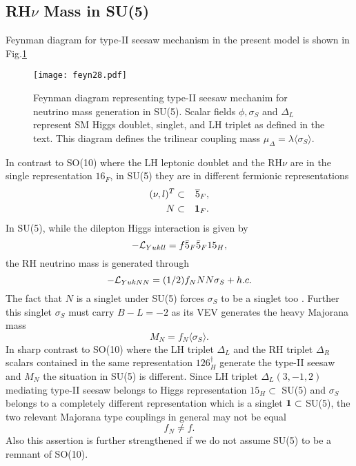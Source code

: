 \documentclass[a4paper,11pt]{article}
\newcommand{\be}{\begin{equation}}
\newcommand{\ee}{\end{equation}}
\newcommand{\bea}{\begin{eqnarray}}
\newcommand{\eea}{\end{eqnarray}}
\begin{document}
\subsection{RH$\nu$ Mass in SU(5)}

Feynman diagram for type-II seesaw mechanism in the present model is
shown in Fig.\ref{fig:su5mod2}
\begin{figure}[htbp]
 \texttt{[image: feyn28.pdf]}
 \caption{Feynman diagram representing type-II seesaw mechanim for
   neutrino mass generation in SU(5). Scalar fields $\phi, \sigma_S$ and
   $\Delta_L$ represent SM Higgs doublet, singlet, and LH triplet as
   defined in the text. This diagram defines the trilinear coupling
   mass $\mu_{\Delta}=\lambda \langle \sigma_S \rangle$.}   
\label{fig:su5mod2}
\end{figure}
In contrast to SO(10) where the LH leptonic doublet and the RH$\nu$ are
in the single representation ${16}_F$, in SU(5) they are in different fermionic
representations
\bea
(\nu, l)^T & \subset & {\overline 5}_F,\nonumber\\
N& \subset & {\bf 1}_F.\label{eq:fermiso10}
\eea
In SU(5), while the dilepton Higgs interaction is given by
\be
-{\cal L}_{Yukll}=f {\bar 5}_F{\bar 5}_F{15}_H,\label{eq:Yukll5}
\ee
the RH neutrino mass is  generated through
\be 
-{\cal L}_{YukNN}= (1/2)f_NN N \sigma_S +h.c.\label{eq:YukNN5}
\ee 
The fact that $N$ is a singlet under SU(5) forces $\sigma_S$ to be a singlet too . Further 
this singlet $\sigma_S$ must carry $B-L=-2$ as its VEV generates the
heavy  Majorana mass
\be 
M_N=f_N\langle \sigma_S \rangle .\label{eq:MN}
\ee
In sharp contrast to SO(10) where the LH triplet $\Delta_L$
and the RH triplet $\Delta_R$ scalars contained in the same representation
${126}_H^{\dagger}$ generate the type-II seesaw and $M_N$ the
situation in SU(5) is different. Since  LH
triplet $\Delta_L(3,-1,2)$ mediating type-II seesaw belongs to Higgs
representation ${15}_H\subset $ SU(5) and $\sigma_S$ belongs to a completely
different representation which is a singlet ${\bf 1}\subset$ SU(5), the
two relevant Majorana type couplings in general may not be equal
\be
f_N\neq f.               \label{eq:unequal}
\ee
Also this assertion is further strengthened if we do not assume SU(5)
to be a remnant of SO(10).
\end{document}
